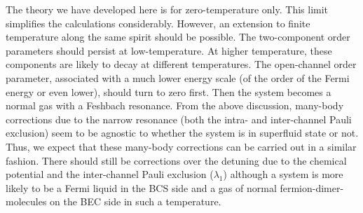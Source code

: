        
\begin{unsure}
The theory we have developed here is for zero-temperature only. This limit simplifies the calculations considerably.  However, an extension to finite temperature along the same spirit should be possible.  The two-component order parameters should persist at low-temperature.  At higher temperature, these components  are likely to decay at different temperatures.  The open-channel order parameter, associated with a much lower energy scale (of the order of  the Fermi energy or even lower), should turn to zero first.  Then the system becomes a normal gas with a Feshbach resonance.  From the above discussion, many-body corrections due to the narrow resonance (both the intra- and inter-channel Pauli exclusion) seem to be agnostic to whether the system is in superfluid state or not.  Thus, we expect that these many-body corrections can be carried out in a similar fashion.   There should still be corrections over the detuning due to the chemical potential and the  inter-channel Pauli exclusion ($\lambda_{1}$) although a system is more likely to be a Fermi liquid in the BCS side and a gas of normal fermion-dimer-molecules on the BEC side in such a temperature.   
\end{unsure}
